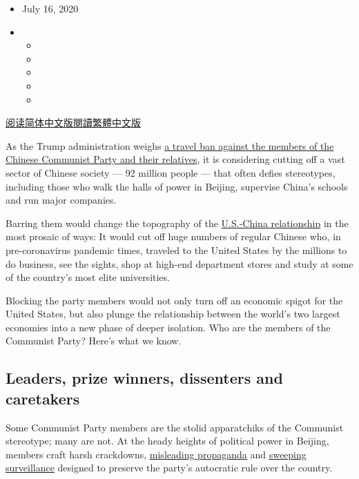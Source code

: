 \begin{itemize}
\item
  July 16, 2020
\item
  \begin{itemize}
  \item
  \item
  \item
  \item
  \item
  \end{itemize}
\end{itemize}

\href{https://cn.nytimes.com/usa/20200717/china-communist-party-travel-ban-explain/}{阅读简体中文版}\href{https://cn.nytimes.com/usa/20200717/china-communist-party-travel-ban-explain/zh-han}{閱讀繁體中文版}

As the Trump administration weighs
\href{https://www.nytimes.com/2020/07/15/us/politics/china-travel-ban.html}{a
travel ban against the members of the Chinese Communist Party and their
relatives}, it is considering cutting off a vast sector of Chinese
society --- 92 million people --- that often defies stereotypes,
including those who walk the halls of power in Beijing, supervise
China's schools and run major companies.

Barring them would change the topography of the
\href{https://www.nytimes.com/2020/07/23/world/asia/us-china-consulate.html}{U.S.-China
relationship} in the most prosaic of ways: It would cut off huge numbers
of regular Chinese who, in pre-coronavirus pandemic times, traveled to
the United States by the millions to do business, see the sights, shop
at high-end department stores and study at some of the country's most
elite universities.

Blocking the party members would not only turn off an economic spigot
for the United States, but also plunge the relationship between the
world's two largest economies into a new phase of deeper isolation. Who
are the members of the Communist Party? Here's what we know.

\hypertarget{leaders-prize-winners-dissenters-and-caretakers}{%
\subsection{Leaders, prize winners, dissenters and
caretakers}\label{leaders-prize-winners-dissenters-and-caretakers}}

Some Communist Party members are the stolid apparatchiks of the
Communist stereotype; many are not. At the heady heights of political
power in Beijing, members craft harsh crackdowns,
\href{https://www.nytimes.com/2020/06/07/world/asia/china-coronavirus.html}{misleading
propaganda} and
\href{https://www.nytimes.com/2020/06/17/world/asia/China-DNA-surveillance.html}{sweeping
surveillance} designed to preserve the party's autocratic rule over the
country.

